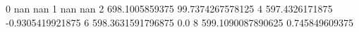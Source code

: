 0 nan nan
1 nan nan
2 698.1005859375 99.7374267578125
4 597.4326171875 -0.9305419921875
6 598.3631591796875 0.0
8 599.1090087890625 0.745849609375
